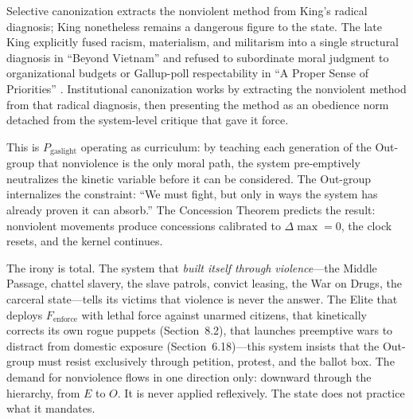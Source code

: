 Selective canonization extracts the nonviolent method from King's radical diagnosis; King nonetheless remains a dangerous figure to the state. The late King explicitly fused racism, materialism, and militarism into a single structural diagnosis in ``Beyond Vietnam'' and refused to subordinate moral judgment to organizational budgets or Gallup-poll respectability in ``A Proper Sense of Priorities'' \cite{king_beyond_vietnam_stanford, king_proper_sense_priorities_stanford}. Institutional canonization works by extracting the nonviolent method from that radical diagnosis, then presenting the method as an obedience norm detached from the system-level critique that gave it force.

This is $P_{\text{gaslight}}$ operating as curriculum: by teaching each generation of the Out-group that nonviolence is the only moral path, the system pre-emptively neutralizes the kinetic variable before it can be considered. The Out-group internalizes the constraint: ``We must fight, but only in ways the system has already proven it can absorb.'' The Concession Theorem predicts the result: nonviolent movements produce concessions calibrated to $\Delta\max = 0$, the clock resets, and the kernel continues.

The irony is total. The system that \textit{built itself through violence}---the Middle Passage, chattel slavery, the slave patrols, convict leasing, the War on Drugs, the carceral state---tells its victims that violence is never the answer. The Elite that deploys $F_{\text{enforce}}$ with lethal force against unarmed citizens, that kinetically corrects its own rogue puppets (Section~8.2), that launches preemptive wars to distract from domestic exposure (Section~6.18)---this system insists that the Out-group must resist exclusively through petition, protest, and the ballot box. The demand for nonviolence flows in one direction only: downward through the hierarchy, from $E$ to $O$. It is never applied reflexively. The state does not practice what it mandates.

